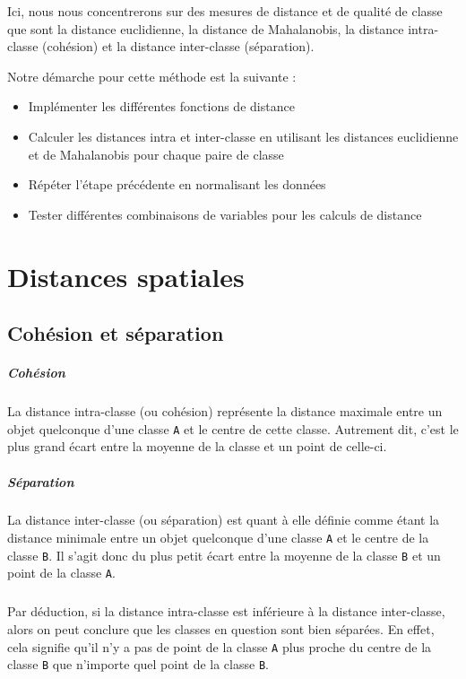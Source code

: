 \documentclass[french]{report}
\begin{document}
    Ici, nous nous concentrerons sur des mesures de distance et de qualité de classe que sont la distance euclidienne, la distance de Mahalanobis, la distance intra-classe (cohésion) et la distance inter-classe (séparation).
    
    \noindent Notre démarche pour cette méthode est la suivante :
    
    \begin{itemize}
        \item Implémenter les différentes fonctions de distance
        \item Calculer les distances intra et inter-classe en utilisant les distances euclidienne et de Mahalanobis pour chaque paire de classe
        \item Répéter l'étape précédente en normalisant les données
        \item Tester différentes combinaisons de variables pour les calculs de distance
    \end{itemize}
    
    \chapter{Distances spatiales}
    
    \section{Cohésion et séparation}
    
    \paragraph{Cohésion}
    La distance intra-classe (ou cohésion) représente la distance maximale entre un objet quelconque d'une classe \texttt{A} et le centre de cette classe.
    Autrement dit, c'est le plus grand écart entre la moyenne de la classe et un point de celle-ci.
    
    \paragraph{Séparation}
    La distance inter-classe (ou séparation) est quant à elle définie comme étant la distance minimale entre un objet quelconque d'une classe \texttt{A} et le centre de la classe \texttt{B}.
    Il s'agit donc du plus petit écart entre la moyenne de la classe \texttt{B} et un point de la classe \texttt{A}.
    
    \paragraph{}
    Par déduction, si la distance intra-classe est inférieure à la distance inter-classe, alors on peut conclure que les classes en question sont bien séparées.
    En effet, cela signifie qu'il n'y a pas de point de la classe \texttt{A} plus proche du centre de la classe \texttt{B} que n'importe quel point de la classe \texttt{B}.
    
\end{document}
